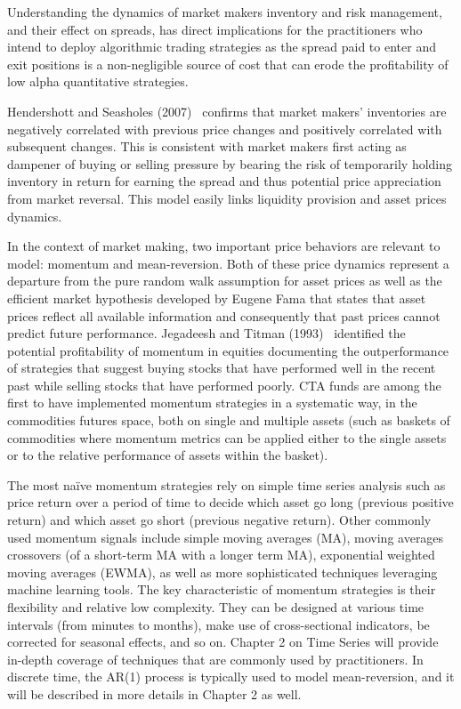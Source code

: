 Understanding the dynamics of market makers inventory and risk management, and their effect on spreads, has direct implications for the practitioners who intend to deploy algorithmic trading strategies as the spread paid to enter and exit positions is a non-negligible source of cost that can erode the profitability of low alpha quantitative strategies. 


Hendershott and Seasholes (2007)~\cite{hendersea} confirms that market makers' inventories are negatively correlated with previous price changes and positively correlated with subsequent changes. This is consistent with market makers first acting as dampener of buying or selling pressure by bearing the risk of temporarily holding inventory in return for earning the spread and thus potential price appreciation from market reversal. This model easily links liquidity provision and asset prices dynamics. 


In the context of market making, two important price behaviors are relevant to model: momentum and mean-reversion. Both of these price dynamics represent a departure from the pure random walk assumption for asset prices as well as the efficient market hypothesis developed by Eugene Fama that states that asset prices reflect all available information and consequently that past prices cannot predict future performance. Jegadeesh and Titman (1993)~\cite{JeTit1993} identified the potential profitability of momentum in equities documenting the outperformance of strategies that suggest buying stocks that have performed well in the recent past while selling stocks that have performed poorly. CTA funds are among the first to have implemented momentum strategies in a systematic way, in the commodities futures space, both on single and multiple assets (such as baskets of commodities where momentum metrics can be applied either to the single assets or to the relative performance of assets within the basket). 


The most na\"ive momentum strategies rely on simple time series analysis such as price return over a period of time to decide which asset go long (previous positive return) and which asset go short (previous negative return). Other commonly used momentum signals include simple moving averages (MA), moving averages crossovers (of a short-term MA with a longer term MA), exponential weighted moving averages  (EWMA), as well as more sophisticated techniques leveraging machine learning tools. The key characteristic of momentum strategies is their flexibility and relative low complexity. They can be designed at various time intervals (from minutes to months), make use of cross-sectional indicators, be corrected for seasonal effects, and so on. Chapter 2 on Time Series will provide in-depth coverage of techniques that are commonly used by practitioners. In discrete time, the AR(1) process is typically used to model mean-reversion, and it will be described in more details in Chapter 2 as well. 


